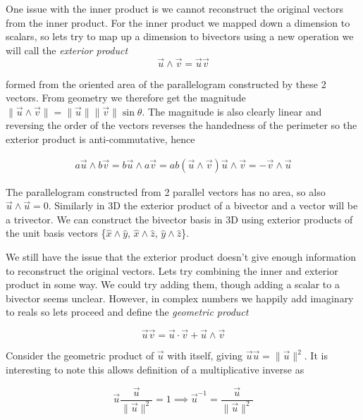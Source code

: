 \documentclass[options]{report}
\def \u{\vec{u}}
\def \v{\vec{v}}
\def \xhat{\hat{x}}
\def \yhat{\hat{y}}
\def \zhat{\hat{z}}
\newcommand{\norm}[1]{\lVert #1 \rVert}
\begin{document}
One issue with the inner product is we cannot reconstruct the original vectors from the inner product. For the inner product we mapped down a dimension to scalars, so lets try to map up a dimension to bivectors using a new operation we will call the \textit{exterior product}
\begin{equation}
	\u \wedge \v = \u\v
\end{equation}

formed from the oriented area of the parallelogram constructed by these 2 vectors. From geometry we therefore get the magnitude $\norm{\u \wedge \v} = \norm{\u} \norm{\v} \sin \theta$. The magnitude is also clearly linear and reversing the order of the vectors reverses the handedness of the perimeter so the exterior product is anti-commutative, hence

\begin{equation}
	\begin{gathered}
		a\u \wedge b\v = b\u \wedge a\v = ab(\u \wedge \v)
		\u \wedge \v = - \v \wedge \u
	\end{gathered}
\end{equation}

The parallelogram constructed from 2 parallel vectors has no area, so also $\u \wedge \u = 0$. Similarly in 3D the exterior product of a bivector and a vector will be a trivector. We can construct the bivector basis in 3D using exterior products of the unit basis vectors \{$\xhat \wedge \yhat$, $\xhat \wedge \zhat$, $\yhat \wedge \zhat$\}. 

We still have the issue that the exterior product doesn't give enough information to reconstruct the original vectors. Lets try combining the inner and exterior product in some way. We could try adding them, though adding a scalar to a bivector seems unclear. However, in complex numbers we happily add imaginary to reals so lets proceed and define the \textit{geometric product}

\begin{equation}
	\u\v = \u \cdot \v + \u \wedge \v
\end{equation}

Consider the geometric product of $\u$ with itself, giving $\u\u = \norm{\u}^2$. It is interesting to note this allows definition of a multiplicative inverse as

\begin{equation}
	\u \frac{\u}{\norm{\u}^2} = 1 \implies \u^{-1} = \frac{\u}{\norm{\u}^2}
\end{equation}
\end{document}
